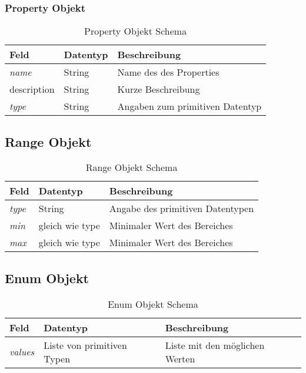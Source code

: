 \subsubsection{Property Objekt}
\begin{table}[H]
\begin{tabularx}{\textwidth}{|l|l|X|}

 \hline \rowcolor{lightgray}
 {\bf Feld } & {\bf Datentyp } & {\bf Beschreibung } \\  \hline
 
 \textit{name}  &  String   &  Name des des Properties \\ \hline
 description    &  String   &  Kurze Beschreibung \\ \hline
 \textit{type}  &  String   &  Angaben zum primitiven Datentyp \\ \hline

\end{tabularx}
\caption{Property Objekt Schema}
\end{table}




\subsection{Range Objekt}

\begin{table}[H]
\begin{tabularx}{\textwidth}{|l|l|X|}

 \hline \rowcolor{lightgray}
 {\bf Feld } & {\bf Datentyp } & {\bf Beschreibung } \\  \hline

 \textit{type}  &  String   & Angabe des primitiven Datentypen        \\ \hline
 \textit{min}   &  gleich wie type   & Minimaler Wert des Bereiches   \\ \hline
 \textit{max}   &  gleich wie type   & Minimaler Wert des Bereiches   \\ \hline

\end{tabularx}
\caption{Range Objekt Schema}
\end{table}

\subsection{Enum Objekt}

\begin{table}[H]
\begin{tabularx}{\textwidth}{|l|l|X|}

 \hline \rowcolor{lightgray}
 {\bf Feld } & {\bf Datentyp } & {\bf Beschreibung } \\  \hline

 \textit{values}  &   Liste von primitiven Typen   & Liste mit den möglichen Werten   \\ \hline

\end{tabularx}
\caption{Enum Objekt Schema}
\end{table}




